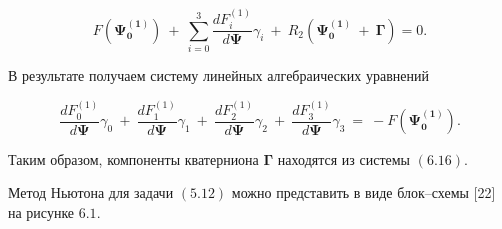 \documentclass[14pt]{extreport}
\begin{document}
\begin{equation}
F(\boldsymbol{\Psi_{0}^{(1)}})\ +\ \sum_{i = 0}^{3}\dfrac{dF_i^{(1)}}{d\boldsymbol\Psi}\gamma_i\ +\ R_2(\boldsymbol{\Psi_{0}^{(1)}}\ +\ \boldsymbol\Gamma) = 0.
\end{equation}

В результате получаем систему линейных алгебраических уравнений

\begin{equation}
\dfrac{dF_0^{(1)}}{d\boldsymbol\Psi}\gamma_0\ +\ \dfrac{dF_1^{(1)}}{d\boldsymbol\Psi}\gamma_1\ +\ \dfrac{dF_2^{(1)}}{d\boldsymbol\Psi}\gamma_2 
\ +\ \dfrac{dF_3^{(1)}}{d\boldsymbol\Psi}\gamma_3\ =\ -F(\boldsymbol{\Psi_{0}^{(1)}}).
\end{equation}

Таким образом, компоненты кватерниона $\boldsymbol\Gamma$ находятся из системы $(6.16)$.

Метод Ньютона для задачи $(5.12)$ можно представить в виде блок--схемы [22] на рисунке $6.1$.
\newpage
\end{document}

